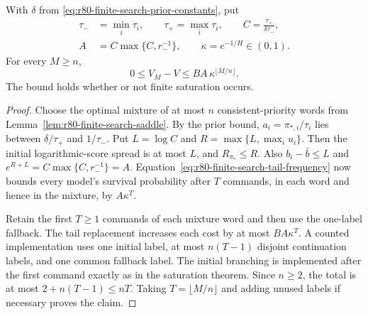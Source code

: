\begin{theorem}
\label{thm:r80-finite-search-resource-bounds}
With $\delta$ from \eqref{eq:r80-finite-search-prior-constants}, put
\begin{equation}\label{eq:r80-finite-search-rate-constants}
 \begin{aligned}
 \tau_-&=\min_i\tau_i,\qquad \tau_+=\max_i\tau_i,\qquad
 C=\frac{\tau_+}{\delta\tau_-},\\
 A&=C\max\{C,r_-^{-1}\},\qquad
 \kappa=e^{-1/H}\in(0,1).
 \end{aligned}
\end{equation}
For every $M\ge n$,
\begin{equation}\label{eq:r80-finite-search-resource-rate}
 0\le V_M-V\le BA\,\kappa^{\lfloor M/n\rfloor}.
\end{equation}
The bound holds whether or not finite saturation occurs.
\end{theorem}
\begin{proof}
Choose the optimal mixture of at most $n$ consistent-priority words
from Lemma~\ref{lem:r80-finite-search-saddle}.  By the prior bound,
$a_i=\pi_{*,i}/\tau_i$ lies between $\delta/\tau_+$ and
$1/\tau_-$.  Put $L=\log C$ and $R=\max\{L,\max_i u_i\}$.
Then the initial logarithmic-score spread is at most $L$, and
$R_{\pi_*}\le R$.  Also $b_i-\bar b\le L$ and
$e^{R+L}=C\max\{C,r_-^{-1}\}=A$.
Equation~\eqref{eq:r80-finite-search-tail-frequency} now bounds
every model's survival probability after $T$ commands, in each word
and hence in the mixture, by $A\kappa^T$.

Retain the first $T\ge1$ commands of each mixture word and then use
the one-label fallback.  The tail replacement increases each cost
by at most $BA\kappa^T$.  A counted implementation uses one initial
label, at most $n(T-1)$ disjoint continuation labels, and one common
fallback label.  The initial branching is implemented after the
first command exactly as in the saturation theorem.  Since $n\ge2$,
the total is at most $2+n(T-1)\le nT$.  Taking
$T=\lfloor M/n\rfloor$ and adding unused labels if necessary proves
the claim.
\end{proof}

